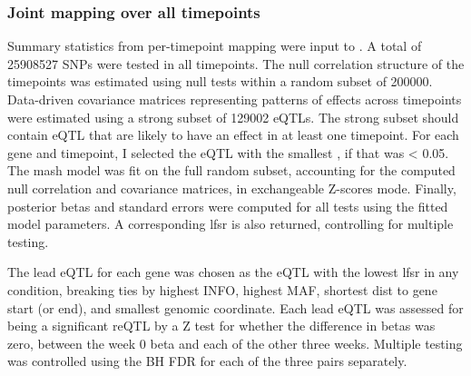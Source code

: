 \begin{outline}
\subsubsection{Joint  mapping over all timepoints}

Summary statistics from per-timepoint mapping were input to .
A total of \num{25908527} \glspl{SNP} were tested in all timepoints.
The null correlation structure of the timepoints was estimated using null tests within a random subset of \num{200000}.
Data-driven covariance matrices representing patterns of effects across timepoints were estimated using a strong subset of \num{129002} \glspl{eQTL}.
The strong subset should contain \gls{eQTL} that are likely to have an effect in at least one timepoint.
For each gene and timepoint, I selected the \gls{eQTL} with the smallest \pvalue, if that \pvalue was < 0.05.
The mash model was fit on the full random subset, accounting for the computed null correlation and covariance matrices, in exchangeable Z-scores mode.
Finally, posterior betas and standard errors were computed for all tests using the fitted model parameters.
A corresponding \gls{lfsr} is also returned, controlling for multiple testing.

The lead \gls{eQTL} for each gene was chosen as the \gls{eQTL} with the lowest \gls{lfsr} in any condition, 
breaking ties by highest INFO, highest \gls{MAF}, shortest dist to gene start (or end), and smallest genomic coordinate.
Each lead \gls{eQTL} was assessed for being a significant \gls{reQTL} by a Z test for whether the difference in betas was zero, between the week 0 beta and each of the other three weeks.
Multiple testing was controlled using the \gls{BH} \gls{FDR} for each of the three pairs separately.



\end{outline}

